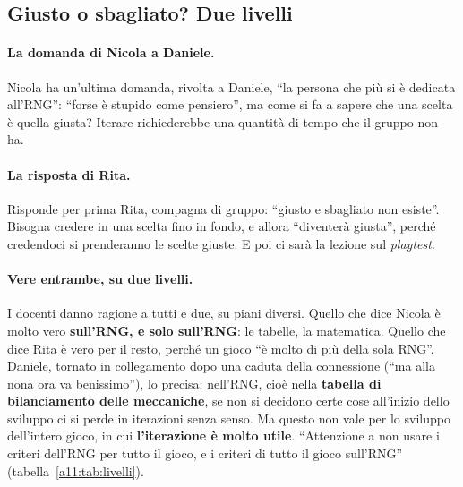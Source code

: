 \subsection{Giusto o sbagliato? Due livelli}

\paragraph{La domanda di Nicola a Daniele.} Nicola ha un'ultima domanda, rivolta a Daniele,
``la persona che più si è dedicata all'RNG'': ``forse è stupido come pensiero'', ma come si
fa a sapere che una scelta è quella giusta? Iterare richiederebbe una quantità di tempo che
il gruppo non ha.

\paragraph{La risposta di Rita.} Risponde per prima Rita, compagna di gruppo: ``giusto e
sbagliato non esiste''. Bisogna credere in una scelta fino in fondo, e allora
``diventerà giusta'', perché credendoci si prenderanno le scelte giuste. E poi ci sarà la
lezione sul \emph{playtest}.

\paragraph{Vere entrambe, su due livelli.} I docenti danno ragione a tutti e due, su piani
diversi. Quello che dice Nicola è molto vero \textbf{sull'RNG, e solo sull'RNG}: le
tabelle, la matematica. Quello che dice Rita è vero per il resto, perché un gioco ``è
molto di più della sola RNG''. Daniele, tornato in collegamento dopo una caduta della
connessione (``ma alla nona ora va benissimo''), lo precisa: nell'RNG, cioè nella
\textbf{tabella di bilanciamento delle meccaniche}, se non si decidono certe cose
all'inizio dello sviluppo ci si perde in iterazioni senza senso. Ma questo non vale per lo
sviluppo dell'intero gioco, in cui \textbf{l'iterazione è molto utile}. ``Attenzione a non
usare i criteri dell'RNG per tutto il gioco, e i criteri di tutto il gioco sull'RNG''
(tabella~\ref{a11:tab:livelli}).

